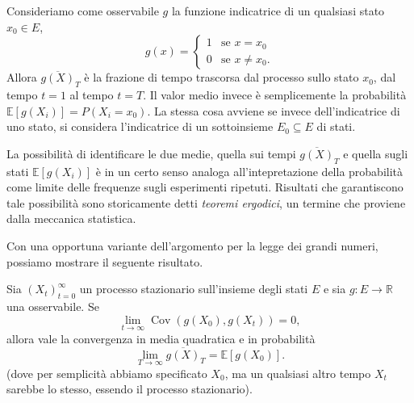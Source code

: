 \documentclass[
  italian,
  letterpaper,
]{book}
\newcommand{\bra}[1]{\left( #1 \right)}
\newcommand{\sqa}[1]{\left[ #1 \right]}
\newcommand{\R}{\mathbb{R}}
\newcommand{\E}[1]{\mathbb{E}\sqa{#1}}
\newcommand{\Cov}[1]{\operatorname{Cov}\bra{#1}}
\theoremstyle{definition}
\theoremstyle{remark}
\begin{document}
Consideriamo come osservabile \(g\) la funzione indicatrice di un
qualsiasi stato \(x_0 \in E\),
\[ g(x) = \begin{cases} 1 & \text{se $x = x_0$}\\
0 & \text{se $x \neq x_0$.}\end{cases}\] Allora \(\overline{g(X)}_T\) è
la frazione di tempo trascorsa dal processo sullo stato \(x_0\), dal
tempo \(t=1\) al tempo \(t=T\). Il valor medio invece è semplicemente la
probabilità \(\E{g(X_i)} = P(X_i = x_0)\). La stessa cosa avviene se
invece dell'indicatrice di uno stato, si considera l'indicatrice di un
sottoinsieme \(E_0 \subseteq E\) di stati.

La possibilità di identificare le due medie, quella sui tempi
\(\overline{g(X)}_T\) e quella sugli stati \(\E{g(X_i)}\) è in un certo
senso analoga all'intepretazione della probabilità come limite delle
frequenze sugli esperimenti ripetuti. Risultati che garantiscono tale
possibilità sono storicamente detti \emph{teoremi ergodici}, un termine
che proviene dalla meccanica statistica.

Con una opportuna variante dell'argomento per la legge dei grandi
numeri, possiamo mostrare il seguente risultato.

Sia \((X_t)_{t =0}^\infty\) un processo stazionario sull'insieme degli
stati \(E\) e sia \(g: E \to \R\) una osservabile. Se
\[ \lim_{t \to \infty} \Cov{g(X_0), g(X_t)} = 0,\] allora vale la
convergenza in media quadratica e in probabilità
\[ \lim_{ T \to \infty} \overline{g(X)}_T = \E{ g(X_0)}.\] (dove per
semplicità abbiamo specificato \(X_0\), ma un qualsiasi altro tempo
\(X_t\) sarebbe lo stesso, essendo il processo stazionario).
\end{document}
